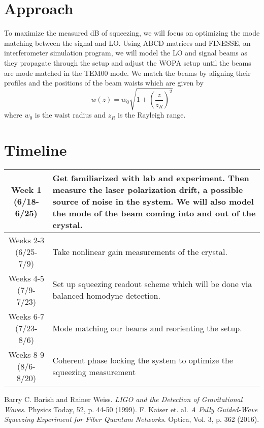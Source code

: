 \documentclass[colorlinks=true,pdfstartview=FitV,linkcolor=blue,
citecolor=red,urlcolor=magenta]{ligodoc}
\begin{document}
\section{Approach}
To maximize the measured dB of squeezing, we will focus on optimizing the mode matching between the signal and LO.
    Using ABCD matrices and FINESSE, an interferometer simulation program, we will model the LO and signal beams as they propagate through the setup and adjust the WOPA setup until the beams are mode matched in the TEM00 mode. We match the beams by aligning their profiles and the positions of the beam waists which are given by
$$w(z)=w_0\sqrt{1+\left(\frac{z}{z_R}\right)^2}$$
where $w_0$ is the waist radius and $z_R$ is the Rayleigh range. 
\section{Timeline}
\begin{center}
\begin{tabular}{|c|m{13cm}|}
    \hline
    Week 1 (6/18-6/25) & Get familiarized with lab and experiment. Then measure the laser polarization drift, a possible source of noise in the system. We will also model the mode of the beam coming into and out of the crystal.\\
   \hline
    Weeks 2-3 (6/25-7/9) & Take nonlinear gain measurements of the crystal.\\
    \hline
    Weeks 4-5 (7/9-7/23) & Set up squeezing readout scheme which will be done via balanced homodyne detection. \\
    \hline
    Weeks 6-7 (7/23-8/6) & Mode matching our beams and reorienting the setup.\\
    \hline
    Weeks 8-9 (8/6-8/20) & Coherent phase locking the system to optimize the squeezing measurement\\
    \hline
\end{tabular}
\end{center}    
\begin{thebibliography}{9}
 Barry C. Barish and Rainer Weiss. \emph{LIGO and the Detection of Gravitational Waves}. Physics Today, 52, p. 44-50 (1999).
 F. Kaiser et. al. \emph{A Fully Guided-Wave Squeezing Experiment for Fiber Quantum Networks}. Optica, Vol. 3, p. 362 (2016).

\end{thebibliography}
\end{document}

